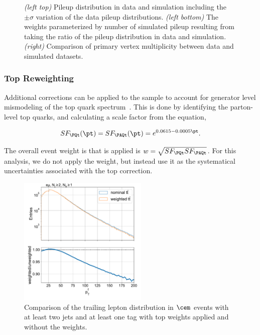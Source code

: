 \begin{figure}[ht]
    \caption{\emph{(left top)} Pileup distribution in data and simulation including the $\pm\sigma$ variation of the data pileup distributions. \emph{(left bottom)} The weights parameterized by number of simulated pileup resulting from taking the ratio of the pileup distribution in data and simulation. \emph{(right)} Comparison of primary vertex multiplicity between data and simulated datasets. }
    \label{fig:analysis:dataset:pileup}
\end{figure}


\FloatBarrier


\subsubsection{Top \pt Reweighting}

Additional corrections can be applied to the \ttbar sample to account for generator level mismodeling of the top quark \pt spectrum~\cite{CMS-PAS-TOP-16-011, CMS-PAS-TOP-16-008}.  This is done by identifying the parton-level top quarks, and calculating a scale factor from the equation,

\begin{equation*}
    SF_{\PQt}(\pt) = SF_{\PAQt}(\pt) = e^{0.0615-0.0005 \pt}.
\end{equation*}


\noindent The overall event weight is that is applied is $w = \sqrt{SF_{\PQt}SF_{\PAQt}}$.  For this analysis, we do not apply the weight, but instead use it as the systematical uncertainties associated with the top \pt correction.

\begin{figure}[ht]
    \centering
    \includegraphics[width=0.55\textwidth]{chapters/Analysis/sectionDataset/figures/top_pt_weight}
    \caption{Comparison of the trailing lepton \pt distribution in $\cem$ events with at least two jets and at least one \PQb tag with top \pt weights applied and without the weights.}
    \label{fig:analysis:dataset:top_pt_weight}
\end{figure}


